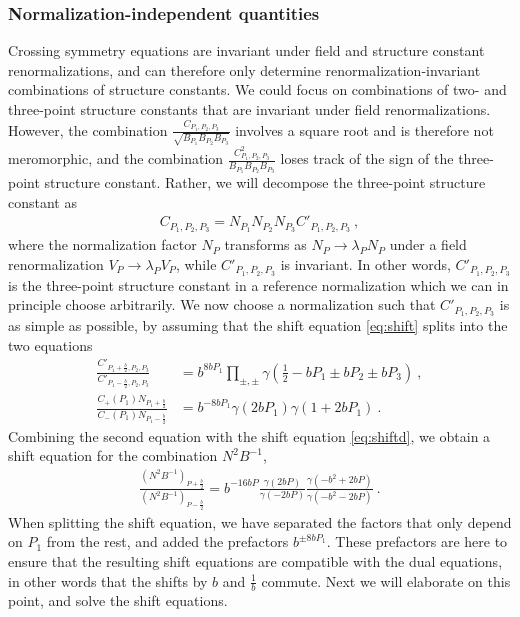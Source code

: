 \documentclass[12pt, a4paper, notitlepage, twoside]{report}
\numberwithin{equation}{section}
\theoremstyle{break}
\begin{document}
\subsubsection{Normalization-independent quantities} 

Crossing symmetry equations are invariant under field and structure constant renormalizations, and can therefore only determine renormalization-invariant combinations of structure constants.
We could focus on combinations of two- and three-point structure constants that are invariant under field renormalizations. However, the combination $\frac{C_{P_1,P_2,P_3}}{\sqrt{B_{P_1}B_{P_2}B_{P_3}}}$ involves a square root and is therefore not meromorphic, and the combination $\frac{C_{P_1,P_2,P_3}^2}{B_{P_1}B_{P_2}B_{P_3}}$ loses track of the sign of the three-point structure constant. 
Rather, we will decompose the three-point structure constant as 
\begin{align}
 C_{P_1,P_2,P_3} = N_{P_1}N_{P_2}N_{P_3}C'_{P_1,P_2,P_3}\ ,
 \label{cnnnc}
\end{align}
where the normalization factor $N_{P}$ transforms as $N_{P}\to \lambda_PN_{P}$ under a field renormalization $V_P\to \lambda_PV_P$, while  $C'_{P_1,P_2,P_3}$ is invariant. In other words, $C'_{P_1,P_2,P_3}$ is the three-point structure constant in a reference normalization which we can in principle choose arbitrarily. We now choose a normalization such that $C'_{P_1,P_2,P_3}$ is as simple as possible, by assuming that the shift equation \eqref{eq:shift} splits into the two equations 
\begin{align}
\frac{C'_{P_1+\frac{b}{2},P_2,P_3}}{C'_{P_1-\frac{b}{2},P_2,P_3} } 
 &=b^{8bP_1}\prod_{\pm,\pm} \gamma(\tfrac12 -bP_1 \pm bP_2 \pm bP_3)\ ,
 \label{cps}
 \\
\frac{C_+(P_1) N_{P_1+\frac{b}{2}}}{C_-(P_1) N_{P_1-\frac{b}{2}} } 
 &=b^{-8bP_1}\gamma(2bP_1) \gamma(1+2bP_1) \ .
 \label{cns}
\end{align}
Combining the second equation with the shift equation \eqref{eq:shiftd}, we obtain a shift equation for the combination $N^2B^{-1}$,
\begin{align}
 \frac{\left(N^2B^{-1}\right)_{P+\frac{b}{2}}}{\left(N^2B^{-1}\right)_{P-\frac{b}{2}}} = b^{-16bP} \frac{\gamma(2bP)}{\gamma(-2bP)} \frac{\gamma(-b^2+2bP)}{\gamma(-b^2-2bP)}\ .
 \label{nbs}
\end{align}
When splitting the shift equation, we have separated the factors that only depend on $P_1$ from the rest, and added the prefactors $b^{\pm 8bP_1}$. These prefactors are here to ensure that the resulting shift equations are compatible with the dual equations, in other words that the shifts by $b$ and $\frac{1}{b}$ commute. Next we will elaborate on this point, and solve the shift equations.
\end{document}
